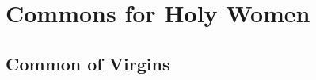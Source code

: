 %
%
%



%
%
%


\clearpage
\section{Commons for Holy Women}

\subsection{Common of Virgins}\label{CommonVirgin}

